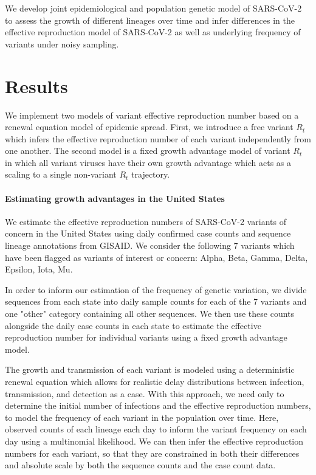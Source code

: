 \documentclass[12pt]{article}
\begin{document}
We develop joint epidemiological and population genetic model of SARS-CoV-2 to assess the growth of different lineages over time and infer differences in the effective reproduction model of SARS-CoV-2 as well as underlying frequency of variants under noisy sampling.

\section{Results}


We implement two models of variant effective reproduction number based on a renewal equation model of epidemic spread. 
First, we introduce a free variant $R_{t}$ which infers the effective reproduction number of each variant independently from one another. 
The second model is a fixed growth advantage model of variant $R_{t}$ in which all variant viruses have their own growth advantage which acts as a scaling to a single non-variant $R_{t}$ trajectory. 


\paragraph{Estimating growth advantages in the United States}

We estimate the effective reproduction numbers of SARS-CoV-2 variants of concern in the United States using daily confirmed case counts and sequence lineage annotations from GISAID. 
We consider the following 7 variants which have been flagged as variants of interest or concern: Alpha, Beta, Gamma, Delta, Epsilon, Iota, Mu. 

In order to inform our estimation of the frequency of genetic variation, we divide sequences from each state into daily sample counts for each of the 7 variants and one "other" category containing all other sequences. 
We then use these counts alongside the daily case counts in each state to estimate the effective reproduction number for individual variants using a fixed growth advantage model. 

The growth and transmission of each variant is modeled using a deterministic renewal equation which allows for realistic delay distributions between infection, transmission, and detection as a case. 
With this approach, we need only to determine the initial number of infections and the effective reproduction numbers, to model the frequency of each variant in the population over time. 
Here, observed counts of each lineage each day to inform the variant frequency on each day using a multinomial likelihood. 
We can then infer the effective reproduction numbers for each variant, so that they are constrained in both their differences and absolute scale by both the sequence counts and the case count data.
\end{document}
